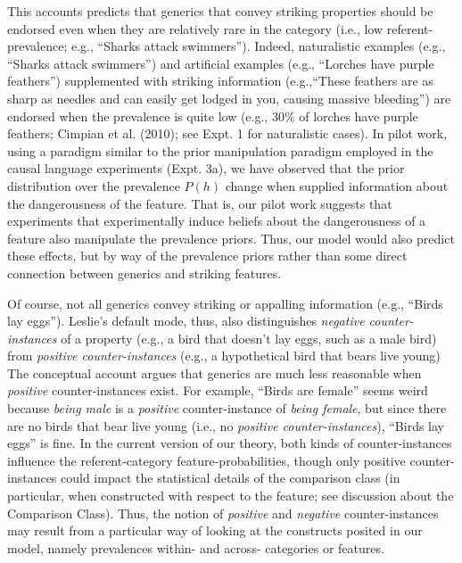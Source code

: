 \documentclass[english,floatsintext,man]{apa6}
\theoremstyle{definition}
\theoremstyle{definition}
\theoremstyle{definition}
\theoremstyle{remark}
\begin{document}
This accounts predicts that generics that convey striking properties
should be endorsed even when they are relatively rare in the category
(i.e., low referent-prevalence; e.g., \enquote{Sharks attack swimmers}).
Indeed, naturalistic examples (e.g., \enquote{Sharks attack swimmers})
and artificial examples (e.g., \enquote{Lorches have purple feathers})
supplemented with striking information (e.g.,\enquote{These feathers are
as sharp as needles and can easily get lodged in you, causing massive
bleeding}) are endorsed when the prevalence is quite low (e.g., 30\% of
lorches have purple feathers; Cimpian et al. (2010); see Expt. 1 for
naturalistic cases). In pilot work, using a paradigm similar to the
prior manipulation paradigm employed in the causal language experiments
(Expt. 3a), we have observed that the prior distribution over the
prevalence \(P(h)\) change when supplied information about the
dangerousness of the feature. That is, our pilot work suggests that
experiments that experimentally induce beliefs about the dangerousness
of a feature also manipulate the prevalence priors. Thus, our model
would also predict these effects, but by way of the prevalence priors
rather than some direct connection between generics and striking
features.

Of course, not all generics convey striking or appalling information
(e.g., \enquote{Birds lay eggs}). Leslie's default mode, thus, also
distinguishes \emph{negative counter-instances} of a property (e.g., a
bird that doesn't lay eggs, such as a male bird) from \emph{positive
counter-instances} (e.g., a hypothetical bird that bears live young) The
conceptual account argues that generics are much less reasonable when
\emph{positive} counter-instances exist. For example, \enquote{Birds are
female} seems weird because \emph{being male} is a \emph{positive}
counter-instance of \emph{being female}, but since there are no birds
that bear live young (i.e., no \emph{positive counter-instances}),
\enquote{Birds lay eggs} is fine. In the current version of our theory,
both kinds of counter-instances influence the referent-category
feature-probabilities, though only positive counter-instances could
impact the statistical details of the comparison class (in particular,
when constructed with respect to the feature; see discussion about the
Comparison Class). Thus, the notion of \emph{positive} and
\emph{negative} counter-instances may result from a particular way of
looking at the constructs posited in our model, namely prevalences
within- and across- categories or features.
\end{document}
